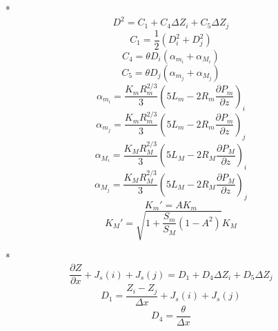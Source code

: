 \begin{itemize}
 \item[*]
  \begin{equation}
   D^2 = C_1 + C_4 \Delta Z_i + C_5 \Delta Z_j
  \end{equation}
  \begin{equation}
   C_1 = \frac{1}{2} ( D_{i}^2 + D_{j}^2 )
  \end{equation}
  \begin{equation}
   C_4 = \theta D_i ( \alpha_{m_i} + \alpha_{M_i} )
  \end{equation}
  \begin{equation}
   C_5 = \theta D_j ( \alpha_{m_j} + \alpha_{M_j} )
  \end{equation}
  \begin{equation}
   \alpha_{m_i} = \frac{K_m R_{m}^{2/3}}{3} \left ( 5 L_m -2 R_m \frac{\partial P_m}{\partial z} \right )_i
  \end{equation}
   \begin{equation}
   \alpha_{m_j} = \frac{K_m R_{m}^{2/3}}{3} \left ( 5 L_m -2 R_m \frac{\partial P_m}{\partial z} \right )_j
  \end{equation}
  \begin{equation}
    \alpha_{M_i} = \frac{K_M R_{M}^{2/3}}{3} \left ( 5 L_M -2 R_M \frac{\partial P_M}{\partial z} \right )_i
  \end{equation}
  \begin{equation}
    \alpha_{M_j} = \frac{K_M R_{M}^{2/3}}{3} \left ( 5 L_M -2 R_M \frac{\partial P_M}{\partial z} \right )_j
  \end{equation}
  \begin{equation}
    K_{m}' = A K_m
  \end{equation}
  \begin{equation}
    K_{M}' = \sqrt{1 + \frac{S_m}{S_M} (1-A^2)} K_M
  \end{equation}
 \item[*]
  \begin{equation}
    \frac{\partial Z}{\partial x} + J_{s}(i) + J_{s}(j) = D_1 + D_4 \Delta Z_i + D_5 \Delta Z_j
  \end{equation}
  \begin{equation}
     D_1 = \frac{Z_i - Z_j}{\Delta x} + J_{s}(i) + J_{s}(j)
  \end{equation}
  \begin{equation}
    D_4 = \frac{\theta}{\Delta x}
  \end{equation}
    \begin{equation}

\end{equation}
\end{itemize}
